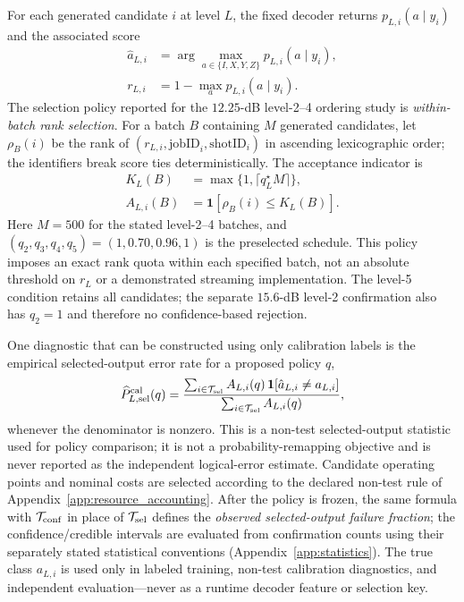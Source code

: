 \documentclass[aps,
prx,
superscriptaddress,
reprint,
longbibliography,
floatfix]{revtex4-2}
\begin{document}
For each generated candidate $i$ at level $L$, the fixed decoder returns $p_{L,i}(a\mid y_i)$ and the associated score
\begin{equation}
\begin{aligned}
\hat a_{L,i}&=\arg\max_{a\in\{I,X,Y,Z\}}p_{L,i}(a\mid y_i),\\[-2pt]
r_{L,i}&=1-\max_a p_{L,i}(a\mid y_i).
\end{aligned}
\label{eq:policy_calibration_risk}
\end{equation}
The selection policy reported for the $12.25$-dB level-2--4 ordering study is \emph{within-batch rank selection}. For a batch $B$ containing $M$ generated candidates, let $\rho_B(i)$ be the rank of $(r_{L,i},\mathrm{jobID}_i,\mathrm{shotID}_i)$ in ascending lexicographic order; the identifiers break score ties deterministically. The acceptance indicator is
\begin{equation}
\begin{aligned}
K_L(B)&=\max\{1,\lceil q_L^\star M\rceil\},\\[-2pt]
A_{L,i}(B)&=\mathbf 1[\rho_B(i)\le K_L(B)].
\end{aligned}
\label{eq:policy_calibration_rank}
\end{equation}
Here $M=500$ for the stated level-2--4 batches, and $(q_2,q_3,q_4,q_5)=(1,0.70,0.96,1)$ is the preselected schedule. This policy imposes an exact rank quota within each specified batch, not an absolute threshold on $r_L$ or a demonstrated streaming implementation. The level-5 condition retains all candidates; the separate $15.6$-dB level-2 confirmation also has $q_2=1$ and therefore no confidence-based rejection.

One diagnostic that can be constructed using only calibration labels is the empirical selected-output error rate for a proposed policy $q$,
\begin{equation}
\widehat P_{L,\rm sel}^{\rm cal}(q)
=\frac{\sum_{i\in\mathcal T_{\rm sel}}A_{L,i}(q)\,\mathbf 1[\hat a_{L,i}\ne a_{L,i}]}
{\sum_{i\in\mathcal T_{\rm sel}}A_{L,i}(q)},
\label{eq:policy_calibration_diagnostic}
\end{equation}
whenever the denominator is nonzero. This is a non-test selected-output statistic used for policy comparison; it is not a probability-remapping objective and is never reported as the independent logical-error estimate. Candidate operating points and nominal costs are selected according to the declared non-test rule of Appendix~\ref{app:resource_accounting}. After the policy is frozen, the same formula with $\mathcal T_{\rm conf}$ in place of $\mathcal T_{\rm sel}$ defines the \emph{observed selected-output failure fraction}; the confidence/credible intervals are evaluated from confirmation counts using their separately stated statistical conventions (Appendix~\ref{app:statistics}). The true class $a_{L,i}$ is used only in labeled training, non-test calibration diagnostics, and independent evaluation---never as a runtime decoder feature or selection key.
\end{document}
